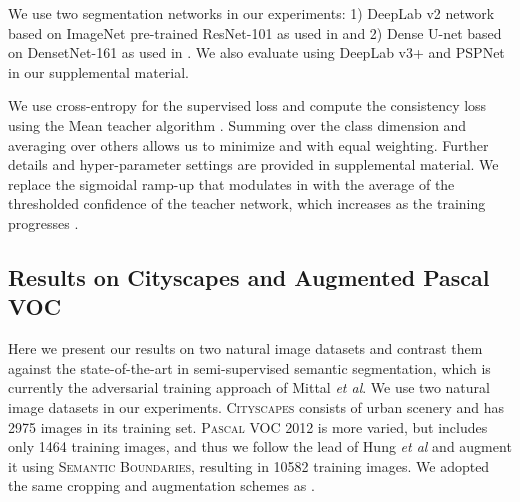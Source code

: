 \documentclass{bmvc2k}
\def\etal{\emph{et al}\bmvaOneDot}
\newcommand{\Cityscapes}{\textsc{Cityscapes}}
\newcommand{\Pascal}{\textsc{Pascal}}
\begin{document}
We use two segmentation networks in our experiments: 1) DeepLab v2 network \cite{Chen:DeepLabv2} based on ImageNet pre-trained ResNet-101 as used in \cite{Mittal:SSSHiLow} and 2) Dense U-net \cite{Li:DenseUNet} based on DensetNet-161 \cite{Huang:DenseNet} as used in \cite{Li:SemiSupSkin}. We also evaluate using DeepLab v3+ \cite{Chen:DeepLabv3plus} and PSPNet \cite{Zhao:PSPNet} in our supplemental material.

We use cross-entropy for the supervised loss  and compute the consistency loss  using the Mean teacher algorithm \cite{Tarvainen:MeanTeachers}.
Summing  over the class dimension and averaging over others allows us to minimize  and  with equal weighting. Further details and hyper-parameter settings are provided in supplemental material.
We replace the sigmoidal ramp-up that modulates  in \cite{Laine:Temporal, Tarvainen:MeanTeachers} with the average of the thresholded confidence of the teacher network, which increases as the training progresses \cite{French:SelfEnsDomAdapt, Sohn:FixMatch, Ke:DualStudent}.











\newcommand{\eb}[1]{\scriptsize\,\,#1\normalsize}
\newcommand{\bp}{\makebox[0pt][l]{\textbf{\hspace*{-0.25mm}\%}}\phantom{\normalfont \%}}




\subsection{Results on Cityscapes and Augmented Pascal VOC}
\label{sec:consseg:res_cityscapes}

Here we present our results on two natural image datasets and contrast them against the state-of-the-art in semi-supervised semantic segmentation, which is currently the adversarial training approach of Mittal \etal\cite{Mittal:SSSHiLow}.  
We use two natural image datasets in our experiments. \Cityscapes{} consists of urban scenery and has 2975 images in its training set.
\Pascal{} VOC 2012\cite{Everingham:PascalVOC2012} is more varied, but includes only 1464 training images, and thus we follow the lead of Hung \etal\cite{Hung:AdvSemiSupSeg} and augment it
using \textsc{Semantic Boundaries}\cite{Hariharan:SemanticContours}, resulting in 10582 training images.
We adopted the same cropping and augmentation schemes as \cite{Mittal:SSSHiLow}.
\end{document}
